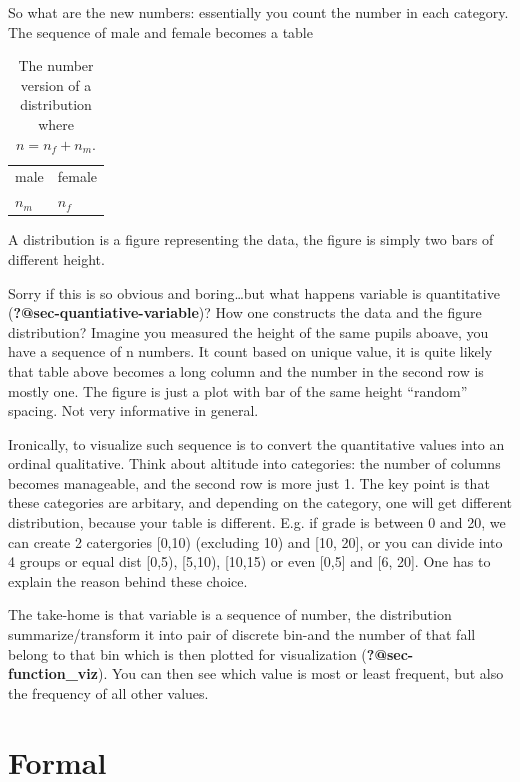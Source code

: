 \documentclass[
  letterpaper,
  DIV=11,
  numbers=noendperiod]{scrreprt}
\begin{document}
So what are the new numbers: essentially you count the number in each
category. The sequence of male and female becomes a table

\begin{longtable}[]{@{}ll@{}}
\caption{The number version of a distribution where
\(n = n_f + n_m\).}\tabularnewline
\toprule\noalign{}
\endfirsthead
\endhead
\bottomrule\noalign{}
\endlastfoot
male & female \\
\(n_m\) & \(n_f\) \\
\end{longtable}

A distribution is a figure representing the data, the figure is simply
two bars of different height.

Sorry if this is so obvious and boring\ldots but what happens variable
is quantitative (\textbf{?@sec-quantiative-variable})? How one
constructs the data and the figure distribution? Imagine you measured
the height of the same pupils aboave, you have a sequence of n numbers.
It count based on unique value, it is quite likely that table above
becomes a long column and the number in the second row is mostly one.
The figure is just a plot with bar of the same height ``random''
spacing. Not very informative in general.

Ironically, to visualize such sequence is to convert the quantitative
values into an ordinal qualitative. Think about altitude into
categories: the number of columns becomes manageable, and the second row
is more just 1. The key point is that these categories are arbitary, and
depending on the category, one will get different distribution, because
your table is different. E.g. if grade is between 0 and 20, we can
create 2 catergories {[}0,10) (excluding 10) and {[}10, 20{]}, or you
can divide into 4 groups or equal dist {[}0,5), {[}5,10), {[}10,15) or
even {[}0,5{]} and {[}6, 20{]}. One has to explain the reason behind
these choice.

The take-home is that variable is a sequence of number, the distribution
summarize/transform it into pair of discrete bin-and the number of that
fall belong to that bin which is then plotted for visualization
(\textbf{?@sec-function\_viz}). You can then see which value is most or
least frequent, but also the frequency of all other values.

\section*{Formal}\label{formal-18}
\end{document}
